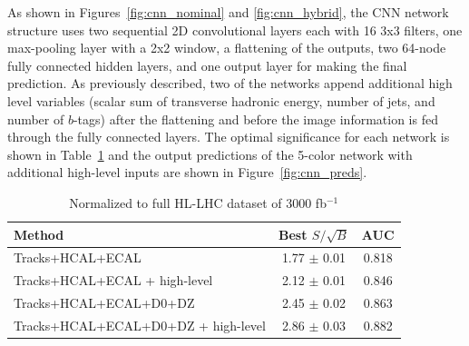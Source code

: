 As shown in Figures~\ref{fig:cnn_nominal} and \ref{fig:cnn_hybrid}, the CNN network structure uses two sequential 2D convolutional layers each with 16 3x3 filters, one max-pooling layer with a 2x2 window, a flattening of the outputs, two 64-node fully connected hidden layers, and one output layer for making the final prediction. As previously described, two of the networks append additional high level variables (scalar sum of transverse hadronic energy, number of jets, and number of $b$-tags) after the flattening and before the image information is fed through the fully connected layers. The optimal significance for each network is shown in Table~\ref{tab:cnnResults} and the output predictions of the 5-color network with additional high-level inputs are shown in Figure~\ref{fig:cnn_preds}.

\begin{table}[h!]
\label{tab:cnnResults}
  \begin{center}
    \begin{tabular}{|l|c|c|} %
      \hline\hline
      \textbf{Method} & Best $S/\sqrt{B}$ & AUC \\
      \hline
      Tracks+HCAL+ECAL & 1.77 $\pm$ 0.01 & 0.818 \\
      Tracks+HCAL+ECAL + high-level & 2.12 $\pm$ 0.01 & 0.846 \\
      Tracks+HCAL+ECAL+D0+DZ & 2.45 $\pm$ 0.02 & 0.863 \\
      Tracks+HCAL+ECAL+D0+DZ + high-level & 2.86 $\pm$ 0.03 & 0.882 \\

      \hline\hline
    \end{tabular}
    \caption{Normalized to full HL-LHC dataset of 3000 fb$^{-1}$}
  \end{center}
\end{table}


